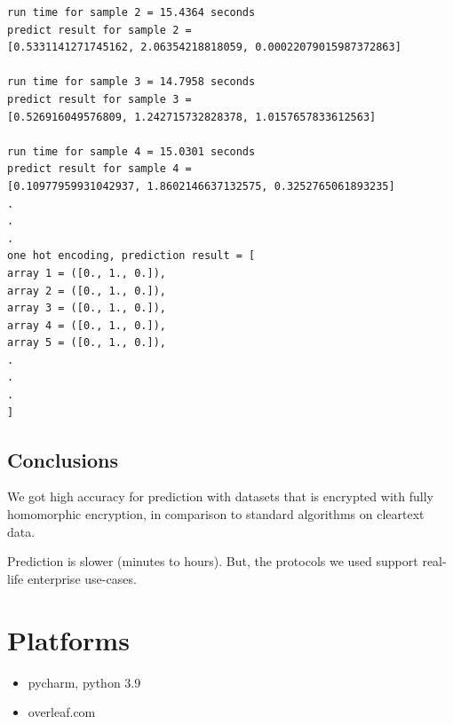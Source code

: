 \documentclass[11pt]{article}
\begin{document}
\begin{lstlisting}
run time for sample 2 = 15.4364 seconds
predict result for sample 2 =
[0.5331141271745162, 2.06354218818059, 0.00022079015987372863]

run time for sample 3 = 14.7958 seconds
predict result for sample 3 =
[0.526916049576809, 1.242715732828378, 1.0157657833612563]

run time for sample 4 = 15.0301 seconds
predict result for sample 4 =
[0.10977959931042937, 1.8602146637132575, 0.3252765061893235]
.
.
.
one hot encoding, prediction result = [
array 1 = ([0., 1., 0.]),
array 2 = ([0., 1., 0.]),
array 3 = ([0., 1., 0.]),
array 4 = ([0., 1., 0.]),
array 5 = ([0., 1., 0.]),
.
.
.
]

\end{lstlisting}



\subsection{Conclusions}
We got high accuracy for prediction with
datasets that is encrypted with fully homomorphic encryption, in comparison to standard algorithms on cleartext data.
\par
Prediction is slower (minutes to hours). But,
the protocols we used support real-life enterprise use-cases.

\section{Platforms}
\begin{itemize}
\item pycharm, python 3.9
\item overleaf.com
\end{itemize}
\end{document}
